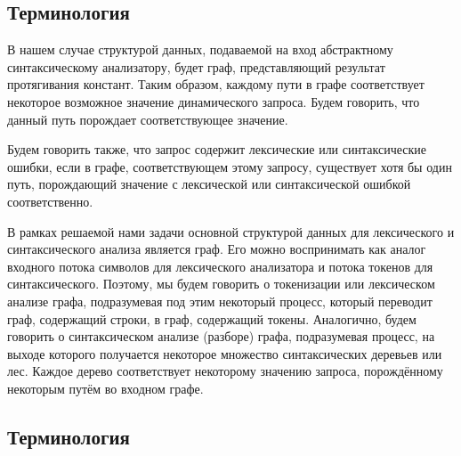 \documentclass{llncs}
\begin{document}
\subsection{Терминология}

В нашем случае структурой данных,  подаваемой на вход абстрактному синтаксическому анализатору, будет граф, представляющий результат протягивания констант. Таким образом, каждому пути в графе соответствует некоторое возможное значение динамического запроса. Будем говорить, что данный путь порождает соответствующее значение.

Будем говорить также, что запрос содержит лексические или синтаксические ошибки, если в графе, соответствующем этому запросу, существует хотя бы один путь, порождающий значение с лексической или синтаксической ошибкой соответственно.

В рамках решаемой нами задачи основной структурой данных для лексического и синтаксического анализа является граф. Его можно воспринимать как аналог входного потока символов для лексического анализатора и потока токенов для синтаксического. Поэтому, мы будем говорить о токенизации или лексическом анализе графа, подразумевая под этим некоторый процесс, который переводит граф, содержащий строки, в граф, содержащий токены. Аналогично, будем говорить о синтаксическом анализе (разборе) графа, подразумевая процесс, на выходе которого получается некоторое множество синтаксических деревьев или лес. Каждое дерево соответствует некоторому значению запроса, порождённому некоторым путём во входном графе.

\subsection{Терминология}
\end{document}
